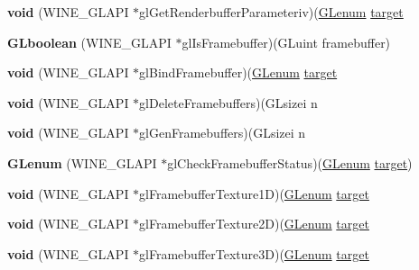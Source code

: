 \begin{DoxyCompactItemize}
{\bfseries void} (W\+I\+N\+E\+\_\+\+G\+L\+A\+PI $\ast$gl\+Get\+Renderbuffer\+Parameteriv)(\hyperlink{interfacevoid}{G\+Lenum} \hyperlink{interfacevoid}{target}
\item 
\mbox{\label{structwined3d__fbo__ops_a006e5232325f2cb30956346158643a17}} 
{\bfseries G\+Lboolean} (W\+I\+N\+E\+\_\+\+G\+L\+A\+PI $\ast$gl\+Is\+Framebuffer)(G\+Luint framebuffer)
\item 
\mbox{\label{structwined3d__fbo__ops_ae6ef83e10744b272d03da5977ff93438}} 
{\bfseries void} (W\+I\+N\+E\+\_\+\+G\+L\+A\+PI $\ast$gl\+Bind\+Framebuffer)(\hyperlink{interfacevoid}{G\+Lenum} \hyperlink{interfacevoid}{target}
\item 
\mbox{\label{structwined3d__fbo__ops_acc675b98f5a3f17648f395aa3b9c6486}} 
{\bfseries void} (W\+I\+N\+E\+\_\+\+G\+L\+A\+PI $\ast$gl\+Delete\+Framebuffers)(G\+Lsizei n
\item 
\mbox{\label{structwined3d__fbo__ops_a52e52ee030feb2d2b23cbc0a146275f2}} 
{\bfseries void} (W\+I\+N\+E\+\_\+\+G\+L\+A\+PI $\ast$gl\+Gen\+Framebuffers)(G\+Lsizei n
\item 
\mbox{\label{structwined3d__fbo__ops_a3b4fc62155302f9f1a5f1146d95404cd}} 
{\bfseries G\+Lenum} (W\+I\+N\+E\+\_\+\+G\+L\+A\+PI $\ast$gl\+Check\+Framebuffer\+Status)(\hyperlink{interfacevoid}{G\+Lenum} \hyperlink{interfacevoid}{target})
\item 
\mbox{\label{structwined3d__fbo__ops_a66f11a2ab5645595c0912b8831784b8e}} 
{\bfseries void} (W\+I\+N\+E\+\_\+\+G\+L\+A\+PI $\ast$gl\+Framebuffer\+Texture1D)(\hyperlink{interfacevoid}{G\+Lenum} \hyperlink{interfacevoid}{target}
\item 
\mbox{\label{structwined3d__fbo__ops_aa4ebcff61a6d2d339df5506740e9920d}} 
{\bfseries void} (W\+I\+N\+E\+\_\+\+G\+L\+A\+PI $\ast$gl\+Framebuffer\+Texture2D)(\hyperlink{interfacevoid}{G\+Lenum} \hyperlink{interfacevoid}{target}
\item 
\mbox{\label{structwined3d__fbo__ops_a3d0c1c9e602a0e230265daff66ad6bd5}} 
{\bfseries void} (W\+I\+N\+E\+\_\+\+G\+L\+A\+PI $\ast$gl\+Framebuffer\+Texture3D)(\hyperlink{interfacevoid}{G\+Lenum} \hyperlink{interfacevoid}{target}

\end{DoxyCompactItemize}
